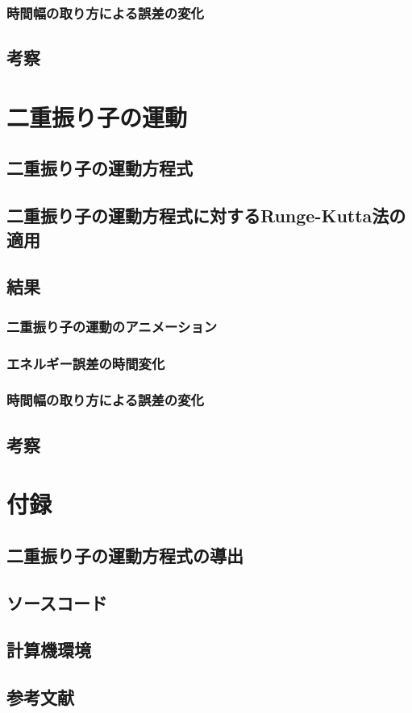 \documentclass[a4paper,11pt]{jsarticle}
\begin{document}
\subsubsection{時間幅の取り方による誤差の変化}

\newpage
\subsection{考察}
\section{二重振り子の運動}
\subsection{二重振り子の運動方程式}

\subsection{二重振り子の運動方程式に対するRunge-Kutta法の適用}

\subsection{結果}
\subsubsection{二重振り子の運動のアニメーション}

\subsubsection{エネルギー誤差の時間変化}

\subsubsection{時間幅の取り方による誤差の変化}

\newpage
\subsection{考察}

\newpage
\section{付録}
\subsection{二重振り子の運動方程式の導出}

\newpage
\subsection{ソースコード}

\newpage

\newpage
\subsection{計算機環境}
\subsection{参考文献}
\end{document}

